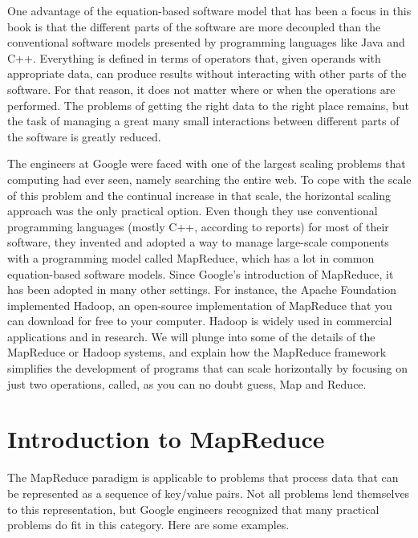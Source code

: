 One advantage of the equation-based software model
that has been a focus in this book is that the
different parts of the software are more decoupled
than the conventional software models presented
by programming languages like Java and C++.
Everything is defined in terms of operators
that, given operands with appropriate data,
can produce results without
interacting with other parts of the software.
For that reason, it does not matter where or when
the operations are performed.
The problems of getting the right data to the right place
remains, but the task of managing a great many small interactions
between different parts of the software is greatly reduced.

The engineers at Google were faced with one of the largest
scaling problems that computing had ever seen,
namely searching the entire web.
To cope with the scale of this problem and the continual
increase in that scale,
the horizontal scaling approach was the only practical option.
Even though they use conventional programming languages
(mostly C++, according to reports) for most of their software,
they invented and adopted a way to manage large-scale components
with a programming model called MapReduce,
which has a lot in common equation-based software models.
Since Google's introduction of MapReduce,
it has been adopted in many other settings.  For
instance, the Apache Foundation implemented Hadoop, an
open-source implementation of MapReduce that you can
download for free to your computer.
Hadoop is widely used in commercial applications and in research.
We will plunge into some of the details of the
MapReduce or Hadoop systems,
and explain how the MapReduce framework simplifies the
development of programs that can scale horizontally by
focusing on just two operations, called, as you can
no doubt guess, Map and Reduce.

\section{Introduction to MapReduce}

The MapReduce paradigm is applicable to problems that process
data that can be represented as a sequence of key/value pairs.
Not all problems lend themselves to this representation,
but Google engineers recognized that many practical
problems do fit in this category.  Here are some examples.


